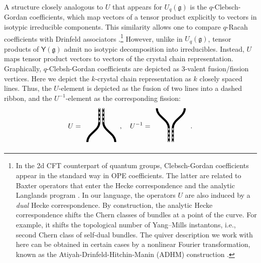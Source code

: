 \documentclass[10pt]{article}
\theoremstyle{definition}
\def\fg{\mathfrak{g}}
\def\myY{{\mathsf{Y}}}
\numberwithin{equation}{section}
\begin{document}
A structure closely analogous to $U$ that appears for $U_q(\fg)$ is the $q$-Clebsch-Gordan coefficients, which map vectors of a tensor product explicitly to vectors in isotypic irreducible components.
This similarity allows one to compare $q$-Racah coefficients with Drinfeld associators \cite{Lanina:2026kew}.\footnote{
In the 2d CFT counterpart of quantum groups, Clebsch-Gordan coefficients appear in the standard way in OPE coefficients.
The latter are related to Baxter operators that enter the Hecke correspondence and the analytic Langlands program \cite{Levin:2003ab,Ambrosino:2025ab}.
In our language, the operators $U$ are also induced by a \emph{dual} Hecke correspondence.
By construction, the analytic Hecke correspondence shifts the Chern classes of bundles at a point of the curve. 
For example, it shifts the topological number of Yang--Mills instantons, i.e., second Chern class of self-dual bundles.
The quiver description we work with here can be obtained in certain cases by a nonlinear Fourier transformation, known as the Atiyah-Drinfeld-Hitchin-Manin (ADHM) construction \cite{Dorey:2002ik}.
}
However, unlike in $U_q(\fg)$, tensor products of $\myY(\fg)$ admit no isotypic decomposition into irreducibles.
Instead, $U$ maps tensor product vectors to vectors of the crystal chain representation.
Graphically, $q$-Clebsh-Gordan coefficients are depicted as 3-valent fusion/fission vertices.
Here we depict the $k$-crystal chain representation as $k$ closely spaced lines.
Thus, the $U$-element is depicted as the fusion of two lines into a dashed ribbon, and the $U^{-1}$-element as the corresponding fission:
\begin{equation}\label{U_diag}
	U=\begin{array}{c}
		\begin{tikzpicture}
			\draw[line width=1mm] (-0.7,-1) to[out=90,in=270] (-0.1,0) -- (-0.1,0.7) (0.7,-1) to[out=90,in=270] (0.1,0) -- (0.1,0.7);
			\draw[dashed, white, line width =0.5mm] (-0.1,0) -- (-0.1,0.7) (0.1,0) -- (0.1,0.7);
		\end{tikzpicture}
	\end{array},\quad U^{-1}=\begin{array}{c}
	\begin{tikzpicture}[yscale=-1]
		\draw[line width=1mm] (-0.7,-1) to[out=90,in=270] (-0.1,0) -- (-0.1,0.7) (0.7,-1) to[out=90,in=270] (0.1,0) -- (0.1,0.7);
		\draw[dashed, white, line width =0.5mm] (-0.1,0) -- (-0.1,0.7) (0.1,0) -- (0.1,0.7);
	\end{tikzpicture}
	\end{array}\,.
\end{equation}
\end{document}
